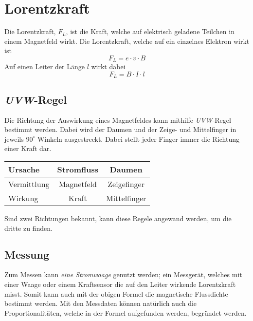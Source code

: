 \documentclass{article}
\begin{document}
 
\section{Lorentzkraft}
Die Lorentzkraft, $F_L$, ist die Kraft, welche auf elektrisch geladene Teilchen in einem Magnetfeld wirkt.
Die Lorentzkraft, welche auf ein einzelnes Elektron wirkt ist
\[
 F_L = e \cdot v \cdot B
\] 
Auf einen Leiter der Länge $l$ wirkt dabei
\[
 F_L = B \cdot I \cdot l
\]
 
\subsection{\emph{UVW}-Regel} 
Die Richtung der Auswirkung eines Magnetfeldes kann mithilfe \emph{UVW}-Regel bestimmt werden. Dabei wird der Daumen und der Zeige- und Mittelfinger in jeweils $90^\circ$ Winkeln ausgestreckt. Dabei stellt jeder Finger immer die Richtung einer Kraft dar.
\begin{center}
\begin{tabular}{ |l|c|c| }
\hline
 \colorbox{red!30}{U}rsache & Stromfluss & Daumen \\
\hline
 \colorbox{red!30}{V}ermittlung & Magnetfeld & Zeigefinger \\
\hline
 \colorbox{red!30}{W}irkung & Kraft & Mittelfinger \\
\hline
\end{tabular}
\end{center}
Sind zwei Richtungen bekannt, kann diese Regele angewand werden, um die dritte zu finden.
 
\subsection{Messung} 
\begin{minipage}{\dimexpr\linewidth-5cm} 
Zum Messen kann \emph{eine Stromwaage} genutzt werden; ein Messgerät, welches mit einer Waage oder einem Kraftsensor die auf den Leiter wirkende Lorentzkraft misst. Somit kann auch mit der obigen Formel die magnetische Flussdichte bestimmt werden. \newline
Mit den Messdaten können natürlich auch die Proportionalitäten, welche in der Formel aufgefunden werden, begründet werden.
\end{minipage} 
\hfill
\begin{minipage}{5cm}
 \center
\end{minipage} 
 
\end{document}
